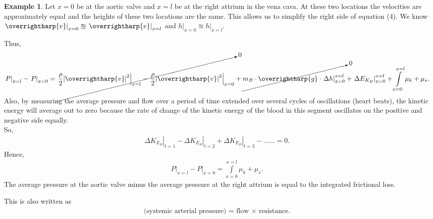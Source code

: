 \documentclass[12pt, a4paper]{article}
\theoremstyle{definition}
\newtheorem{example}{Example}[section]
\theoremstyle{remark}
\theoremstyle{definition}
\newcommand*{\vtr}[1]{\text{\overrightharp{\ensuremath{#1}}}}
\newcommand{\?}{\stackrel{?}{=}}
\begin{document}
\begin{example}
Let $x=0$ be at the aortic valve and $x=l$ be at the right attrium in the vena cava. At these two locations the velocities are approximately equal and the heights of these two locations are the same. This allows us to simplify the right side of equation (4). 
We know $\left. \vtr{v}\right|_{x=0} \approxeq \left. \vtr{v} \right|_{x=l}$ and $\left. h \right|_{x=0} \approxeq \left. h \right|_{x=l}$.

Thus, 
\begin{align}
\displaystyle
\left. P \right|_{x=l} - \left. P \right|_{x=0} = 
\cancelto{0}{\left. \frac{\rho}{2}{|\vtr{v}|}^{2} \right|_{x=l}  - 
\left. \frac{\rho}{2}{|\vtr{v}|}^{2} \right|_{x=0}}+
\cancelto{0}{{m}_{B}\cdot\vtr{g}\cdot \left. \Delta h \right|_{x=0}^{x=l}} + 
\displaystyle \left. \Delta {E}_{{K}_{B}} \right|_{x=0}^{x=l} +
\int\limits_{x=0}^{x=l} {\mu}_{k} + {\mu}_{s}.
\end{align}
\newpage
\noindent Also, by measuring the average pressure and flow over a period of time extended over several cycles of oscillations (heart beats), the kinetic energy will average out to zero because the rate of change of the kinetic energy of the blood in this segment oscillates on the positive and negative side equally.\\
So,
\begin{align*}
\left. \Delta {K}_{{E}_{P}} \right|_{t = 1} - \left. \Delta {K}_{{E}_{P}} \right|_{t = 2} + \left. \Delta {K}_{{E}_{P}} \right|_{t = 3} - \ldots\ldots = 0.
\end{align*}
Hence,  
\begin{align}
\displaystyle
\left. P \right|_{x=l} - \left. P \right|_{x=0} = \int\limits_{x=0}^{x=l} {\mu}_{k} + {\mu}_{s}.
\end{align}
The average pressure at the aortic valve minus the average pressure at the right attrium is equal to the integrated frictional loss.

This is also written as 
\begin{align}
\text{(systemic arterial pressure) = flow $\times$ resistance.}
\end{align}
\end{example}
\end{document}
